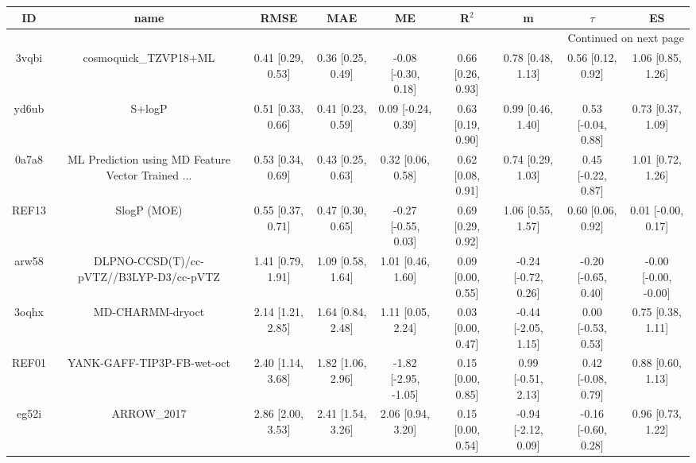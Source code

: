\documentclass{article}
\begin{document}
\begin{center}
\scriptsize
\begin{longtable}{|ccccccccc|}
\toprule
    ID &                                               name &               RMSE &                MAE &                    ME &              R$^2$ &                    m &               $\tau$ &                    ES \\
\midrule
\endhead
\midrule
\multicolumn{9}{r}{{Continued on next page}} \\
\midrule
\endfoot

\bottomrule
\endlastfoot
 3vqbi &                              cosmoquick\_TZVP18+ML &  0.41 [0.29, 0.53] &  0.36 [0.25, 0.49] &   -0.08 [-0.30, 0.18] &  0.66 [0.26, 0.93] &    0.78 [0.48, 1.13] &    0.56 [0.12, 0.92] &     1.06 [0.85, 1.26] \\
 yd6ub &                                             S+logP &  0.51 [0.33, 0.66] &  0.41 [0.23, 0.59] &    0.09 [-0.24, 0.39] &  0.63 [0.19, 0.90] &    0.99 [0.46, 1.40] &   0.53 [-0.04, 0.88] &     0.73 [0.37, 1.09] \\
 0a7a8 &  ML Prediction using MD Feature Vector Trained ... &  0.53 [0.34, 0.69] &  0.43 [0.25, 0.63] &     0.32 [0.06, 0.58] &  0.62 [0.08, 0.91] &    0.74 [0.29, 1.03] &   0.45 [-0.22, 0.87] &     1.01 [0.72, 1.26] \\
 REF13 &                                        SlogP (MOE) &  0.55 [0.37, 0.71] &  0.47 [0.30, 0.65] &   -0.27 [-0.55, 0.03] &  0.69 [0.29, 0.92] &    1.06 [0.55, 1.57] &    0.60 [0.06, 0.92] &    0.01 [-0.00, 0.17] \\
 arw58 &            DLPNO-CCSD(T)/cc-pVTZ//B3LYP-D3/cc-pVTZ &  1.41 [0.79, 1.91] &  1.09 [0.58, 1.64] &     1.01 [0.46, 1.60] &  0.09 [0.00, 0.55] &  -0.24 [-0.72, 0.26] &  -0.20 [-0.65, 0.40] &  -0.00 [-0.00, -0.00] \\
 3oqhx &                                   MD-CHARMM-dryoct &  2.14 [1.21, 2.85] &  1.64 [0.84, 2.48] &     1.11 [0.05, 2.24] &  0.03 [0.00, 0.47] &  -0.44 [-2.05, 1.15] &   0.00 [-0.53, 0.53] &     0.75 [0.38, 1.11] \\
 REF01 &                         YANK-GAFF-TIP3P-FB-wet-oct &  2.40 [1.14, 3.68] &  1.82 [1.06, 2.96] &  -1.82 [-2.95, -1.05] &  0.15 [0.00, 0.85] &   0.99 [-0.51, 2.13] &   0.42 [-0.08, 0.79] &     0.88 [0.60, 1.13] \\
 eg52i &                                        ARROW\_2017 &  2.86 [2.00, 3.53] &  2.41 [1.54, 3.26] &     2.06 [0.94, 3.20] &  0.15 [0.00, 0.54] &  -0.94 [-2.12, 0.09] &  -0.16 [-0.60, 0.28] &     0.96 [0.73, 1.22] \\
\end{longtable}
\end{center}
\end{document}
